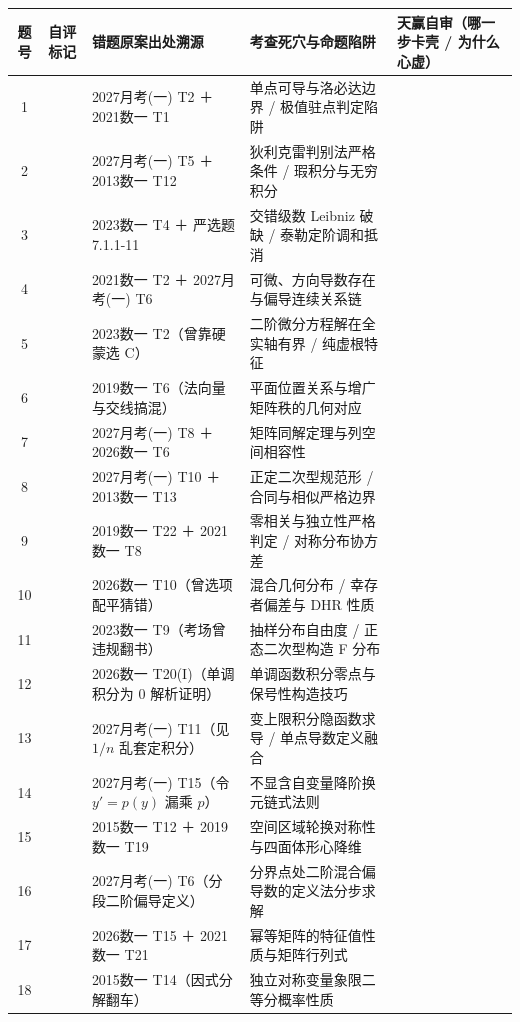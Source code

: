 \documentclass[11pt,a4paper]{ctexart}
\begin{document}
{\footnotesize
\renewcommand{\arraystretch}{1.15}
\begin{tabularx}{\linewidth}{|c|p{1.7cm}|p{3.7cm}|X|p{3.0cm}|}
\hline
\textbf{题号} & \textbf{自评标记} & \textbf{错题原案出处溯源} & \textbf{考查死穴与命题陷阱} & \textbf{天赢自审（哪一步卡壳 / 为什么心虚）}\\
\hline
1 & & 2027月考(一) T2 ＋ 2021数一 T1 & 单点可导与洛必达边界 / 极值驻点判定陷阱 & \\ \hline
2 & & 2027月考(一) T5 ＋ 2013数一 T12 & 狄利克雷判别法严格条件 / 瑕积分与无穷积分 & \\ \hline
3 & & 2023数一 T4 ＋ 严选题7.1.1-11 & 交错级数 Leibniz 破缺 / 泰勒定阶调和抵消 & \\ \hline
4 & & 2021数一 T2 ＋ 2027月考(一) T6 & 可微、方向导数存在与偏导连续关系链 & \\ \hline
5 & & 2023数一 T2（曾靠硬蒙选 C） & 二阶微分方程解在全实轴有界 / 纯虚根特征 & \\ \hline
6 & & 2019数一 T6（法向量与交线搞混） & 平面位置关系与增广矩阵秩的几何对应 & \\ \hline
7 & & 2027月考(一) T8 ＋ 2026数一 T6 & 矩阵同解定理与列空间相容性 & \\ \hline
8 & & 2027月考(一) T10 ＋ 2013数一 T13 & 正定二次型规范形 / 合同与相似严格边界 & \\ \hline
9 & & 2019数一 T22 ＋ 2021数一 T8 & 零相关与独立性严格判定 / 对称分布协方差 & \\ \hline
10 & & 2026数一 T10（曾选项配平猜错） & 混合几何分布 / 幸存者偏差与 DHR 性质 & \\ \hline
11 & & 2023数一 T9（考场曾违规翻书） & 抽样分布自由度 / 正态二次型构造 F 分布 & \\ \hline
12 & & 2026数一 T20(I)（单调积分为 0 解析证明） & 单调函数积分零点与保号性构造技巧 & \\ \hline
13 & & 2027月考(一) T11（见 $1/n$ 乱套定积分） & 变上限积分隐函数求导 / 单点导数定义融合 & \\ \hline
14 & & 2027月考(一) T15（令 $y'=p(y)$ 漏乘 $p$） & 不显含自变量降阶换元链式法则 & \\ \hline
15 & & 2015数一 T12 ＋ 2019数一 T19 & 空间区域轮换对称性与四面体形心降维 & \\ \hline
16 & & 2027月考(一) T6（分段二阶偏导定义） & 分界点处二阶混合偏导数的定义法分步求解 & \\ \hline
17 & & 2026数一 T15 ＋ 2021数一 T21 & 幂等矩阵的特征值性质与矩阵行列式 & \\ \hline
18 & & 2015数一 T14（因式分解翻车） & 独立对称变量象限二等分概率性质 & \\ \hline

\end{tabularx}}
\end{document}
